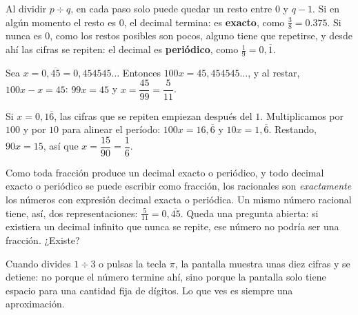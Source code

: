 \documentclass[11pt]{article}
\begin{document}
\begin{ejemplo}
Al dividir $p \div q$, en cada paso solo puede quedar un resto entre $0$ y
$q - 1$. Si en algún momento el resto es $0$, el decimal termina: es
\textbf{exacto}, como $\frac{3}{8} = \num{0,375}$. Si nunca es $0$, como los
restos posibles son pocos, alguno tiene que repetirse, y desde ahí las
cifras se repiten: el decimal es \textbf{periódico}, como
$\frac{1}{9} = 0{,}\overline{1}$.
\end{ejemplo}

\begin{ejemplo}
Sea $x = 0{,}\overline{45} = 0{,}454545\ldots$ Entonces
$100x = 45{,}454545\ldots$, y al restar, $100x - x = 45$: $99x = 45$ y
$x = \dfrac{45}{99} = \dfrac{5}{11}$.
\end{ejemplo}

\begin{ejemplo}
Si $x = 0{,}1\overline{6}$, las cifras que se repiten empiezan después del
$1$. Multiplicamos por $100$ y por $10$ para alinear el período:
$100x = 16{,}\overline{6}$ y $10x = 1{,}\overline{6}$. Restando,
$90x = 15$, así que $x = \dfrac{15}{90} = \dfrac{1}{6}$.
\end{ejemplo}

Como toda fracción produce un decimal exacto o periódico, y todo decimal
exacto o periódico se puede escribir como fracción, los racionales son
\emph{exactamente} los números con expresión decimal exacta o periódica. Un
mismo número racional tiene, así, dos representaciones:
$\frac{5}{11} = 0{,}\overline{45}$. Queda una pregunta abierta: si existiera
un decimal infinito que nunca se repite, ese número no podría ser una
fracción. ¿Existe?

\begin{aplicacion}
Cuando divides $1 \div 3$ o pulsas la tecla $\pi$, la pantalla muestra unas
diez cifras y se detiene: no porque el número termine ahí, sino porque la
pantalla solo tiene espacio para una cantidad fija de dígitos. Lo que ves es
siempre una aproximación.
\end{aplicacion}
\end{document}
